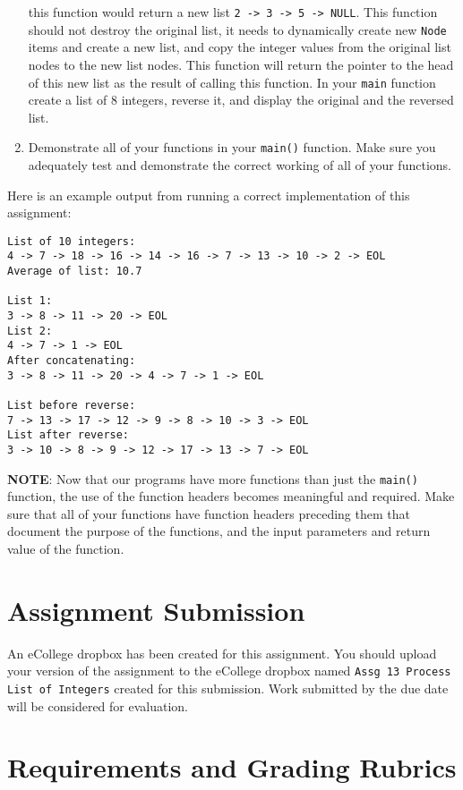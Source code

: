 \documentclass[11pt]{article}
\begin{document}
\begin{enumerate}
   this function would return a new list \verb~2 -> 3 -> 5 -> NULL~.  This
   function should not destroy the original list, it needs to dynamically
   create new \verb~Node~ items and create a new list, and copy the
   integer values from the original list nodes to the new list
   nodes.  This function will return the pointer to the head of this
   new list as the result of calling this function.  In your \verb~main~
   function create a list of 8 integers, reverse it, and display
   the original and the reversed list.
\item Demonstrate all of your functions in your \verb~main()~ function.  Make
   sure you adequately test and demonstrate the correct working of all
   of your functions.
\end{enumerate}


Here is an example output from running a correct implementation of
this assignment:


\begin{verbatim}
List of 10 integers:
4 -> 7 -> 18 -> 16 -> 14 -> 16 -> 7 -> 13 -> 10 -> 2 -> EOL
Average of list: 10.7

List 1:
3 -> 8 -> 11 -> 20 -> EOL
List 2:
4 -> 7 -> 1 -> EOL
After concatenating: 
3 -> 8 -> 11 -> 20 -> 4 -> 7 -> 1 -> EOL

List before reverse:
7 -> 13 -> 17 -> 12 -> 9 -> 8 -> 10 -> 3 -> EOL
List after reverse:
3 -> 10 -> 8 -> 9 -> 12 -> 17 -> 13 -> 7 -> EOL
\end{verbatim}

\textbf{NOTE}: Now that our programs have more functions than just the
\verb~main()~ function, the use of the function headers becomes meaningful
and required.  Make sure that all of your functions have function
headers preceding them that document the purpose of the functions, and
the input parameters and return value of the function.
\section*{Assignment Submission}
\label{sec-4}


An eCollege dropbox has been created for this assignment.  You should
upload your version of the assignment to the eCollege dropbox named
\verb~Assg 13 Process List of Integers~ created for this submission.  Work
submitted by the due date will be considered for evaluation.
\section*{Requirements and Grading Rubrics}
\label{sec-5}
\end{document}
